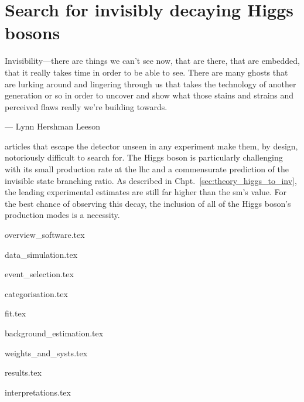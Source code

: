 \chapter{Search for invisibly decaying Higgs bosons}
\label{chap:higgstoinv}

\epigraph{Invisibility---there are things we can't see now, that are there, that are embedded, that it really takes time in order to be able to see. There are many ghosts that are lurking around and lingering through us that takes the technology of another generation or so in order to uncover and show what those stains and strains and perceived flaws really we're building towards.}{--- Lynn Hershman Leeson}

articles that escape the detector unseen in any experiment make them, by design, notoriously difficult to search for. The Higgs boson is particularly challenging with its small production rate at the \acrshort{lhc} and a commensurate prediction of the invisible state branching ratio. As described in Chpt.~\ref{sec:theory_higgs_to_inv}, the leading experimental estimates are still far higher than the \acrlong{sm}'s value. For the best chance of observing this decay, the inclusion of all of the Higgs boson's production modes is a necessity.




{overview_software.tex}




{data_simulation.tex}




{event_selection.tex}




{categorisation.tex}




{fit.tex}




{background_estimation.tex}




{weights_and_systs.tex}




{results.tex}




{interpretations.tex}

